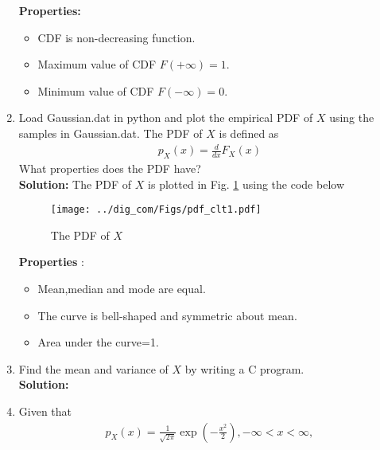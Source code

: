 \documentclass{article}
\numberwithin{equation}{subsection}
\numberwithin{figure}{subsection}
\providecommand{\brak}[1]{\ensuremath{\left(#1\right)}}
\newcommand{\solution}{\noindent \textbf{Solution: }}
\renewcommand\thesection{\arabic{section}}
\renewcommand\thesubsection{\thesection.\arabic{subsection}}
\begin{document}
\begin{enumerate}[label=\thesubsection.\arabic*,ref=\thesubsection.\arabic{figure}]
\begin{center}
\end{center}
\textbf{Properties:}
\begin{itemize}
\item CDF is non-decreasing function.
\item Maximum value of CDF $F(+\infty)=1$.
\item Minimum value of CDF $F(-\infty)=0$.
\end{itemize}
\item
Load Gaussian.dat in python and plot the empirical PDF of $X$ using the samples in Gaussian.dat. The PDF of $X$ is defined as
\begin{align}
p_{X}(x) = \frac{d}{dx}F_{X}(x)
\end{align}
What properties does the PDF have?
\\
\solution The PDF of $X$ is plotted in Fig. \ref{fig:gauss_pdf} using the code below
\begin{center}
\end{center}
\begin{figure}
\centering
\texttt{[image: ../dig\_com/Figs/pdf\_clt1.pdf]}  
\caption{The PDF of $X$}
\label{fig:gauss_pdf}
\end{figure}
\textbf{Properties} : 
\begin{itemize}
\item Mean,median and mode are equal.
\item The curve is bell-shaped and symmetric about mean.
\item Area under the curve=1.
\end{itemize}
\item Find the mean and variance of $X$ by writing a C program.\\
\solution 
\begin{center}
\end{center}
\begin{center}
\end{center}
\item Given that 
\begin{align}
p_{X}(x) = \frac{1}{\sqrt{2\pi}}\exp\brak{-\frac{x^2}{2}}, -\infty < x < \infty,

\end{align}
\end{enumerate}
\end{document}
